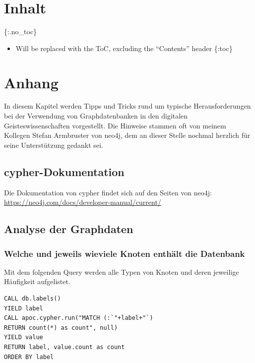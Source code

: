 \documentclass[ngerman,]{scrreprt}
\providecommand{\tightlist}{%
  \setlength{\itemsep}{0pt}\setlength{\parskip}{0pt}}
\begin{document}
\chapter{Inhalt}\label{inhalt-10}

\{:.no\_toc\}

\begin{itemize}
\tightlist
\item
  Will be replaced with the ToC, excluding the ``Contents'' header \{:toc\}
\end{itemize}

\chapter{Anhang}\label{anhang}

In diesem Kapitel werden Tipps und Tricks rund um typische Herausforderungen bei der Verwendung von Graphdatenbanken in den digitalen Geisteswissenschaften vorgestellt. Die Hinweise stammen oft von meinem Kollegen Stefan Armbruster von neo4j, dem an dieser Stelle nochmal herzlich für seine Unterstützung gedankt sei.

\section{cypher-Dokumentation}\label{cypher-dokumentation}

Die Dokumentation von cypher findet sich auf den Seiten von neo4j: \url{https://neo4j.com/docs/developer-manual/current/}

\section{Analyse der Graphdaten}\label{analyse-der-graphdaten}

\subsection{Welche und jeweils wieviele Knoten enthält die Datenbank}\label{welche-und-jeweils-wieviele-knoten-enthuxe4lt-die-datenbank}

Mit dem folgenden Query werden alle Typen von Knoten und deren jeweilige Häufigkeit aufgelistet.

\begin{verbatim}
CALL db.labels()
YIELD label
CALL apoc.cypher.run("MATCH (:`"+label+"`)
RETURN count(*) as count", null)
YIELD value
RETURN label, value.count as count
ORDER BY label
\end{verbatim}
\end{document}
